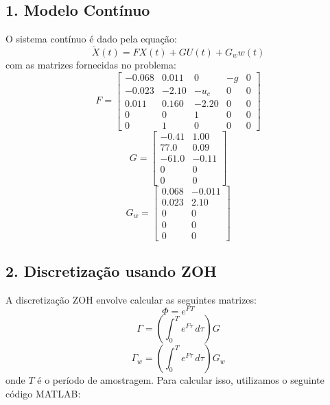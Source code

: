 \documentclass[a4paper, 12pt]{article}
\begin{document}
\subsection{1. Modelo Contínuo}

O sistema contínuo é dado pela equação:
\[
\dot{X}(t) = F X(t) + G U(t) + G_w w(t)
\]
com as matrizes fornecidas no problema:
\[
F = \begin{bmatrix}
-0.068 & 0.011 & 0 & -g & 0 \\
-0.023 & -2.10 & -u_c & 0 & 0 \\
0.011 & 0.160 & -2.20 & 0 & 0 \\
0 & 0 & 1 & 0 & 0 \\
0 & 1 & 0 & 0 & 0 
\end{bmatrix}
\]
\[
G = \begin{bmatrix}
-0.41 & 1.00 \\
77.0 & 0.09 \\
-61.0 & -0.11 \\
0 & 0 \\
0 & 0 
\end{bmatrix}
\]
\[
G_w = \begin{bmatrix}
0.068 & -0.011 \\
0.023 & 2.10 \\
0 & 0 \\
0 & 0 \\
0 & 0 
\end{bmatrix}
\]

\subsection*{2. Discretização usando ZOH}

A discretização ZOH envolve calcular as seguintes matrizes:
\[
\Phi = e^{FT}
\]
\[
\Gamma = \left( \int_0^T e^{F \tau} \, d\tau \right) G
\]
\[
\Gamma_w = \left( \int_0^T e^{F \tau} \, d\tau \right) G_w
\]
onde \( T \) é o período de amostragem. Para calcular isso, utilizamos o seguinte código MATLAB:
\end{document}
